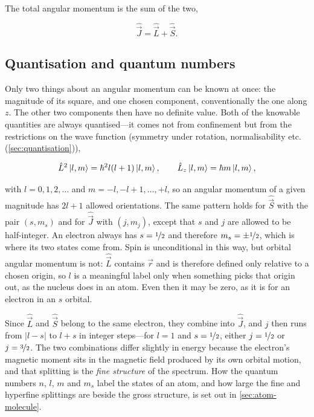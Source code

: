     The total angular momentum is the sum of the two,

    \begin{equation*}
        \hat{\vec{J}} = \hat{\vec{L}} + \hat{\vec{S}} .
    \end{equation*}

    \subsection{Quantisation and quantum numbers}

        Only two things about an angular momentum can be known at once: the magnitude of its square, and one chosen component, conventionally the one along $z$. The other two components then have no definite value. Both of the knowable quantities are always quantised---it comes not from confinement but from the restrictions on the wave function (symmetry under rotation, normalisability etc. (\cref{sec:quantisation})),

        \begin{equation*}
            \hat{L}^{2}\ket{l,m} = \hbar^{2}l(l+1)\ket{l,m}, \qquad
            \hat{L}_{z}\ket{l,m} = \hbar m\ket{l,m},
        \end{equation*}

        with $l = 0,1,2,\dots$ and $m = -l,-l+1,\dots,+l$, so an angular momentum of a given magnitude has $2l+1$ allowed orientations. The same pattern holds for $\hat{\vec{S}}$ with the pair $(s,m_s)$ and for $\hat{\vec{J}}$ with $(j,m_j)$, except that $s$ and $j$ are allowed to be half-integer. An electron always has $s = \nicefrac{1}{2}$ and therefore $m_s = \pm\nicefrac{1}{2}$, which is where its two states come from. Spin is unconditional in this way, but orbital angular momentum is not: $\hat{\vec{L}}$ contains $\vec{r}$ and is therefore defined only relative to a chosen origin, so $l$ is a meaningful label only when something picks that origin out, as the nucleus does in an atom. Even then it may be zero, as it is for an electron in an $s$ orbital.

        Since $\hat{\vec{L}}$ and $\hat{\vec{S}}$ belong to the same electron, they combine into $\hat{\vec{J}}$, and $j$ then runs from $|l-s|$ to $l+s$ in integer steps---for $l=1$ and $s=\nicefrac{1}{2}$, either $j=\nicefrac{1}{2}$ or $j=\nicefrac{3}{2}$. The two combinations differ slightly in energy because the electron's magnetic moment sits in the magnetic field produced by its own orbital motion, and that splitting is the \emph{fine structure} of the spectrum. How the quantum numbers $n$, $l$, $m$ and $m_{s}$ label the states of an atom, and how large the fine and hyperfine splittings are beside the gross structure, is set out in \cref{sec:atom-molecule}.

